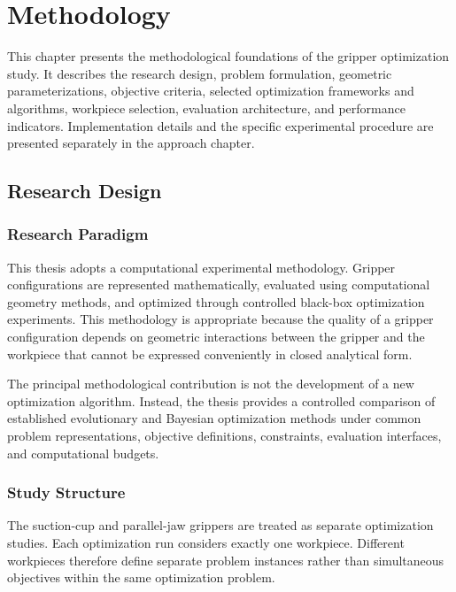 \chapter{Methodology}
\label{chap:methodology}

This chapter presents the methodological foundations of the gripper optimization study. It describes the research design, problem formulation,
geometric parameterizations, objective criteria, selected optimization frameworks and algorithms, workpiece selection, evaluation architecture, and
performance indicators. Implementation details and the specific experimental procedure are presented separately in the approach chapter.

\section{Research Design}
\label{sec:research_design}

\subsection{Research Paradigm}
\label{subsec:research_paradigm}

This thesis adopts a computational experimental methodology. Gripper configurations are represented mathematically, evaluated using computational
geometry methods, and optimized through controlled black-box optimization experiments. This methodology is appropriate because the quality of a
gripper configuration depends on geometric interactions between the gripper and the workpiece that cannot be expressed conveniently in closed
analytical form.

The principal methodological contribution is not the development of a new optimization algorithm. Instead, the thesis provides a controlled comparison
of established evolutionary and Bayesian optimization methods under common problem representations, objective definitions, constraints, evaluation
interfaces, and computational budgets.

\subsection{Study Structure}
\label{subsec:study_structure}

The suction-cup and parallel-jaw grippers are treated as separate optimization studies. Each optimization run considers exactly one workpiece.
Different workpieces therefore define separate problem instances rather than simultaneous objectives within the same optimization problem.

